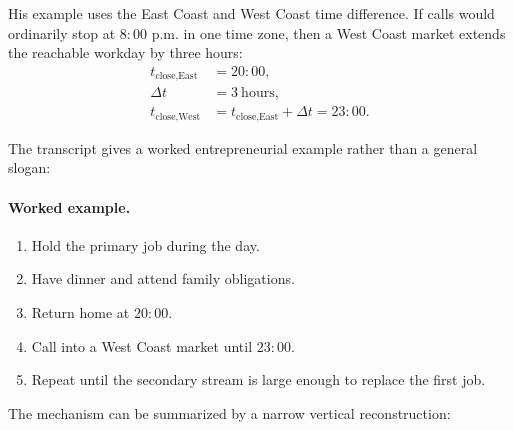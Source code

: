 His example uses the East Coast and West Coast time difference. If calls would ordinarily stop at \(8{:}00\) p.m. in one time zone, then a West Coast market extends the reachable workday by three hours:
\begin{align}
t_{\text{close,East}} &= 20{:}00,\\
\Delta t &= 3\ \text{hours},\\
t_{\text{close,West}} &= t_{\text{close,East}} + \Delta t = 23{:}00.
\end{align}

The transcript gives a worked entrepreneurial example rather than a general slogan:
\paragraph{Worked example.}
\begin{enumerate}
\item Hold the primary job during the day.
\item Have dinner and attend family obligations.
\item Return home at \(20{:}00\).
\item Call into a West Coast market until \(23{:}00\).
\item Repeat until the secondary stream is large enough to replace the first job.
\end{enumerate}

The mechanism can be summarized by a narrow vertical reconstruction:

\begin{figure}[h]
\centering
{}
\end{figure}

